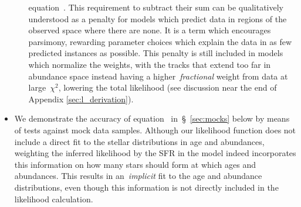 \documentclass[ms.tex]{subfiles}
\begin{document}
\begin{itemize}
\begin{itemize}
		equation~.
		This requirement to subtract their sum can be qualitatively understood
		as a penalty for models which predict data in regions of the observed
		space where there are none.
		It is a term which encourages parsimony, rewarding parameter choices
		which explain the data in as few predicted instances as possible.
		This penalty is still included in models which normalize the weights,
		with the tracks that extend too far in abundance space instead having a
		higher~\textit{fractional} weight from data at large~$\chi^2$, lowering
		the total likelihood (see discussion near the end of Appendix
		\ref{sec:l_derivation}).
	\end{itemize}

	\item 
	We demonstrate the accuracy of equation~
	in~\S~\ref{sec:mocks} below by means of tests against mock data samples.
	Although our likelihood function does not include a direct fit to
	the stellar distributions in age and abundances, weighting the inferred
	likelihood by the SFR in the model indeed incorporates this information on
	how many stars should form at which ages and abundances.
	This results in an~\textit{implicit} fit to the age and abundance
	distributions, even though this information is not directly included in the
	likelihood calculation.


\end{itemize}
\end{document}
